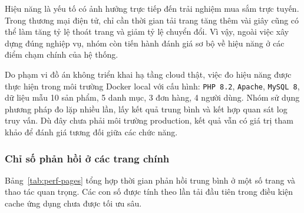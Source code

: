 \documentclass[11pt, a4paper]{article}
\begin{document}
Hiệu năng là yếu tố có ảnh hưởng trực tiếp đến trải nghiệm mua sắm trực tuyến.
Trong thương mại điện tử, chỉ cần thời gian tải trang tăng thêm vài giây cũng
có thể làm tăng tỷ lệ thoát trang và giảm tỷ lệ chuyển đổi. Vì vậy, ngoài việc
xây dựng đúng nghiệp vụ, nhóm còn tiến hành đánh giá sơ bộ về hiệu năng ở các
điểm chạm chính của hệ thống.

Do phạm vi đồ án không triển khai hạ tầng cloud thật, việc đo hiệu năng được
thực hiện trong môi trường Docker local với cấu hình:
\texttt{PHP 8.2}, \texttt{Apache}, \texttt{MySQL 8}, dữ liệu mẫu 10 sản phẩm,
5 danh mục, 3 đơn hàng, 4 người dùng. Nhóm sử dụng phương pháp đo lặp nhiều lần,
lấy kết quả trung bình và kết hợp quan sát log truy vấn. Dù đây chưa phải môi
trường production, kết quả vẫn có giá trị tham khảo để đánh giá tương đối giữa
các chức năng.

\subsubsection{Chỉ số phản hồi ở các trang chính}

Bảng~\ref{tab:perf-pages} tổng hợp thời gian phản hồi trung bình ở một số trang
và thao tác quan trọng. Các con số được tính theo lần tải đầu tiên trong điều kiện
cache ứng dụng chưa được tối ưu sâu.
\end{document}
